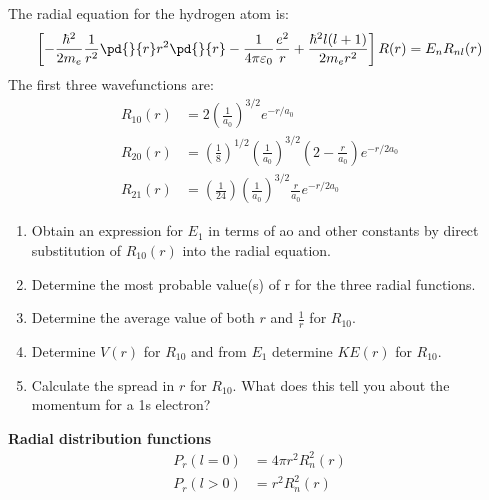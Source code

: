 \item The radial equation for the hydrogen atom is:
\begin{align*}
    \left[-\frac{\hbar^2}{2m_e}\frac{1}{r^2}\pd{}{r}r^2\pd{}{r}-\frac{1}{4\pi\varepsilon_0}\frac{e^2}{r}+\frac{\hbar^2l(l+1)}{2m_er^2}\right]R(r)=E_nR_{nl}(r)
\end{align*}
The first three wavefunctions are:
\begin{align*}
    R_{10}(r) & =2\left(\frac{1}{a_0}\right)^{3/2}e^{-r/a_0}                                                           \\
    R_{20}(r) & =\left(\frac{1}{8}\right)^{1/2}\left(\frac{1}{a_0}\right)^{3/2}\left(2-\frac{r}{a_0}\right)e^{-r/2a_0} \\
    R_{21}(r) & =\left(\frac{1}{24}\right)\left(\frac{1}{a_0}\right)^{3/2}\frac{r}{a_0}e^{-r/2a_0}
\end{align*}

\begin{enumerate}
    \item Obtain an expression for $E_1$ in terms of ao and other constants by direct substitution of $R_{10}(r)$
          into the radial equation.
    \item Determine the most probable value(s) of r for the three radial functions.
    \item Determine the average value of both $r$ and $\frac{1}{r}$ for $R_{10}$.
    \item Determine $V(r)$ for $R_{10}$ and from $E_1$ determine $KE(r)$ for $R_{10}$.
    \item Calculate the spread in $r$ for $R_{10}$. What does this tell you about the momentum for a 1s electron?
\end{enumerate}

\begin{tcolorbox}
    \textbf{Radial distribution functions}
    \begin{align*}
        P_r(l=0) & =4\pi r^2R_n^2(r) \\
        P_r(l>0) & =r^2R_n^2(r)
    \end{align*}
\end{tcolorbox}

